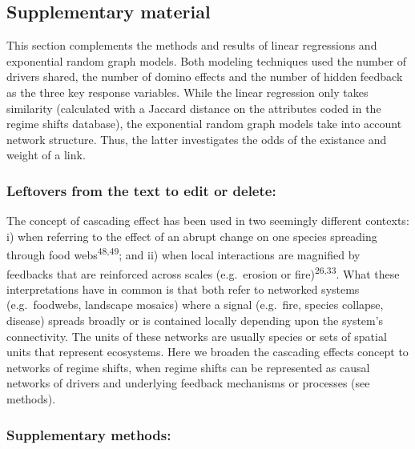 \documentclass[9pt,]{article}
\begin{document}
\pagebreak

\subsection{Supplementary material}\label{supplementary-material}

This section complements the methods and results of linear regressions
and exponential random graph models. Both modeling techniques used the
number of drivers shared, the number of domino effects and the number of
hidden feedback as the three key response variables. While the linear
regression only takes similarity (calculated with a Jaccard distance on
the attributes coded in the regime shifts database), the exponential
random graph models take into account network structure. Thus, the
latter investigates the odds of the existance and weight of a link.

\subsubsection{Leftovers from the text to edit or
delete:}\label{leftovers-from-the-text-to-edit-or-delete}

The concept of cascading effect has been used in two seemingly different
contexts: i) when referring to the effect of an abrupt change on one
species spreading through food webs\textsuperscript{48,49}; and ii) when
local interactions are magnified by feedbacks that are reinforced across
scales (e.g.~erosion or fire)\textsuperscript{26,33}. What these
interpretations have in common is that both refer to networked systems
(e.g.~foodwebs, landscape mosaics) where a signal (e.g.~fire, species
collapse, disease) spreads broadly or is contained locally depending
upon the system's connectivity. The units of these networks are usually
species or sets of spatial units that represent ecosystems. Here we
broaden the cascading effects concept to networks of regime shifts, when
regime shifts can be represented as causal networks of drivers and
underlying feedback mechanisms or processes (see methods).

\subsubsection{Supplementary methods:}\label{supplementary-methods}
\end{document}

